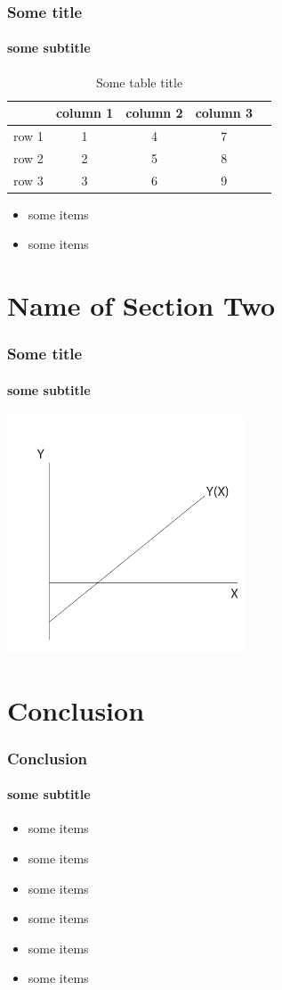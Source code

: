 \documentclass{beamer}
\begin{document}
\begin{frame}[t]\frametitle{Some title}
\framesubtitle{some subtitle}
\begin{table}[ht]
\centering
\caption{\small{Some table title}}\label{tab:some_table_label}
\begin{tabular}{lcccc}
  \hline
 & column 1 & column 2 & column 3 \\
  \hline
  row 1 & 1          & 4          & 7 \\
  row 2 & 2          & 5          & 8 \\
  row 3 & 3          & 6          & 9 \\
   \hline
\end{tabular}
\end{table}
  \begin{itemize}
      \item some items
      \item some items
   \end{itemize}
\end{frame}



\section{Name of Section Two}

\begin{frame}[t]\frametitle{Some title}
\framesubtitle{some subtitle}
  \begin{center}
  \includegraphics[width=200pt]{sample-figure}
  \end{center}
\end{frame}



\section{Conclusion}

\begin{frame}[t]\frametitle{Conclusion}
\framesubtitle{some subtitle}
    \begin{itemize}
      \item some items
      \item some items
      \item some items
      \item some items
      \item some items
      \item some items
   \end{itemize}

\end{frame}
\end{document}
